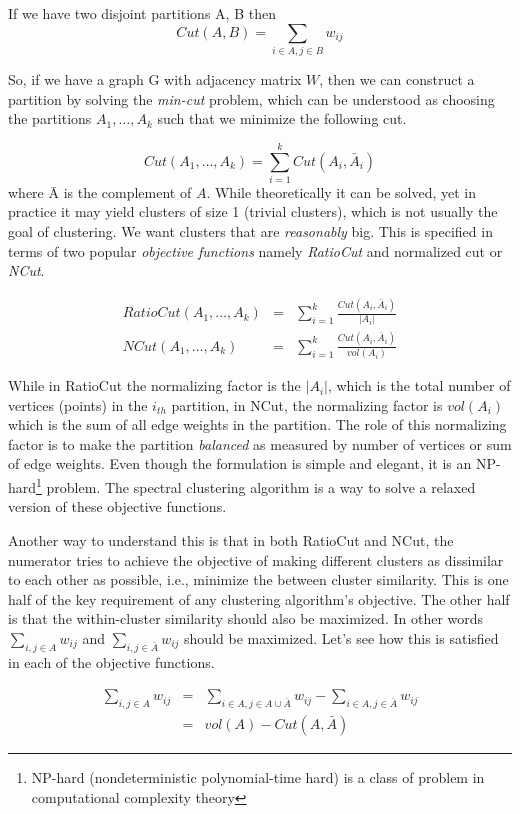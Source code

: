 If we have two disjoint partitions A, B then 
\[
	Cut(A,B) = \sum_{i \in A,j \in B}w_{ij}
\] 
	
So, if we have a graph G with adjacency matrix $W$, then we can construct a partition by solving the \textit{min-cut} problem, which can be understood 
as choosing the partitions $A_{1},\dots,A_{k}$ such that we minimize the following cut.

\[
	Cut(A_{1},\dots,A_{k}) = \sum_{i=1}^{k}Cut(A_{i},\bar{A}_{i})
\] 
where \={A} is the complement of $A$. While theoretically it can be solved, yet in practice it may yield clusters of 
size 1 (trivial clusters), which is not usually the goal of clustering. We want clusters that are \textit{reasonably} big. This is 
specified in terms of two popular \textit{objective functions} namely \textit{RatioCut} and normalized cut or \textit{NCut}.

\begin{eqnarray}
    RatioCut(A_{1},\dots,A_{k}) &=& \sum_{i=1}^{k}\frac{Cut(A_{i},\bar{A}_{i})}{|A_{i}|} \\
    NCut(A_{1},\dots,A_{k}) &=& \sum_{i=1}^{k}\frac{Cut(A_{i},\bar{A}_{i})}{vol(A_{i})}
\end{eqnarray}

While in RatioCut the normalizing factor is the $|A_{i}|$, which is the total number of vertices (points) in the $i_{th}$ partition, in NCut, the normalizing factor is $vol(A_{i})$ which is the sum of all edge weights in the partition. The role of this normalizing factor is to make the partition \textit{balanced} as measured by number of vertices or sum of edge weights. Even though the formulation is simple and elegant, it is an NP-hard\footnote{NP-hard (nondeterministic polynomial-time hard) is a class of problem in computational complexity theory} problem. The spectral clustering algorithm is a way to solve a relaxed version of these objective functions. 

Another way to understand this is that in both RatioCut and NCut, the numerator tries to achieve the objective of making different clusters as dissimilar to each other as possible, i.e., minimize the between cluster similarity. This is one half of the key requirement of any clustering algorithm's objective. The other half is that the within-cluster similarity should also be maximized. In other words $\sum_{i,j \in A}w_{ij}$ and $\sum_{i,j \in \bar{A}}w_{ij}$ should be maximized. Let's see how this is satisfied in each of the objective functions. 

\begin{eqnarray}
 \sum_{i,j \in A}w_{ij} &=& \sum_{i \in A, j \in A \cup \bar{A}}w_{ij} - \sum_{i \in A, j \in \bar{A}}w_{ij} \\
                        &=& vol(A) - Cut(A,\bar{A})	 
\end{eqnarray}

